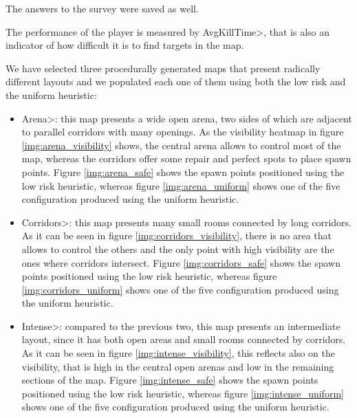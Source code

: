 \noindent
The answers to the survey were saved as well.
 
 \par
 
The performance of the player is measured by \<AvgKillTime>, that is also an indicator of how difficult it is to find targets in the map.

\par
  
We have selected three procedurally generated maps that present radically different layouts and we populated each one of them using both the low risk and the uniform heuristic:

\begin{itemize}
\item \<Arena>: this map presents a wide open arena, two sides of which are adjacent to parallel corridors with many openings. As the visibility heatmap in figure \ref{img:arena_visibility} shows, the central arena allows to control most of the map, whereas the corridors offer some repair and perfect spots to place spawn points. Figure \ref{img:arena_safe} shows the spawn points positioned using the low risk heuristic, whereas figure \ref{img:arena_uniform} shows one of the five configuration produced using the uniform heuristic.
\item \<Corridors>: this map presents many small rooms connected by long corridors. As it can be seen in figure \ref{img:corridors_visibility}, there is no area that allows to control the others and the only point with high visibility are the ones where corridors intersect. Figure \ref{img:corridors_safe} shows the spawn points positioned using the low risk heuristic, whereas figure \ref{img:corridors_uniform} shows one of the five configuration produced using the uniform heuristic.
\item \<Intense>: compared to the previous two, this map presents an intermediate layout, since it has both open areas and small rooms connected by corridors. As it can be seen in figure \ref{img:intense_visibility}, this reflects also on the visibility, that is high in the central open arenas and low in the remaining sections of the map. Figure \ref{img:intense_safe} shows the spawn points positioned using the low risk heuristic, whereas figure \ref{img:intense_uniform} shows one of the five configuration produced using the uniform heuristic.
\end{itemize}

\par

